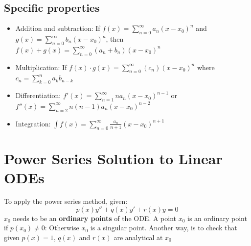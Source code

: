 \subsection{Specific properties}
\begin{itemize}
\item Addition and subtraction: If $f(x)=\sum^\infty_{n=0}a_n(x-x_0)^n$ and $g(x)=\sum^\infty_{n=0}b_n(x-x_0)^n$, then $f(x)+g(x)=\sum^\infty_{n=0}(a_n+b_n)(x-x_0)^n$
\item Multiplication: If $f(x) \cdot g(x)=\sum^\infty_{n=0}(c_n)(x-x_0)^n$ where $c_n=\sum^n_{k=0}a_kb_{n-k}$
\item Differentiation: $f'(x)=\sum^\infty_{n=1}n a_n(x-x_0)^{n-1}$ or  $f''(x)=\sum^\infty_{n=2}n(n-1) a_n(x-x_0)^{n-2}$
\item Integration: $\int f(x)=\sum^\infty_{n=0}\frac{a_n}{n+1}(x-x_0)^{n+1}$
\end{itemize}

\section{Power Series Solution to Linear ODEs}

To apply the power series method, given:
\begin{equation*}
p(x)y''+q(x)y'+r(x)y=0
\end{equation*}
$x_0$ needs to be an \textbf{ordinary points} of the ODE. A point $x_0$
is an ordinary point  if $p(x_0) \neq 0$: Otherwise $x_0$ is a singular point. Another way, is to check that given $p(x)=1$, $q(x)$  and $r(x)$ are analytical at $x_0$

